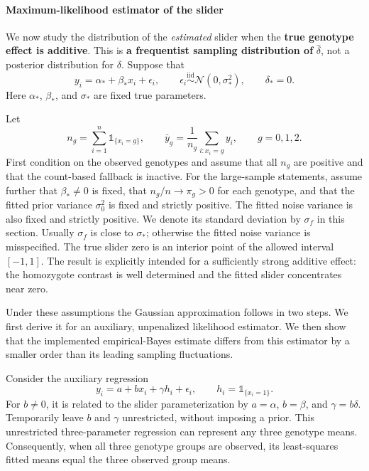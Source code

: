 \documentclass[11pt]{article}
\newcommand{\ind}{\mathbb{1}}
\newcommand{\Normal}{\mathcal{N}}
\begin{document}
\paragraph{Maximum-likelihood estimator of the slider}
We now study the distribution of the \emph{estimated} slider when the
\textbf{true genotype effect is additive}. This is \textbf{a frequentist
sampling distribution of} $\widehat\delta$, not a posterior distribution
for $\delta$. Suppose that
\begin{equation}
y_i=\alpha_*+\beta_*x_i+\epsilon_i,\qquad
\epsilon_i\overset{\mathrm{iid}}{\sim}\Normal(0,\sigma_*^2),
\qquad \delta_*=0.
\label{eq:additive-generating-model}
\end{equation}
Here $\alpha_*$, $\beta_*$, and $\sigma_*$ are fixed true parameters.

Let
\begin{equation}
n_g=\sum_{i=1}^n\ind_{\{x_i=g\}},\qquad
\bar y_g=\frac{1}{n_g}\sum_{i:x_i=g}y_i,
\qquad g=0,1,2.
\label{eq:genotype-group-statistics}
\end{equation}
First condition on the observed genotypes and assume that all $n_g$
are positive and that the count-based fallback is inactive. For the
large-sample statements, assume further that $\beta_*\neq0$ is fixed,
that $n_g/n\longrightarrow\pi_g>0$ for each genotype, and that the
fitted prior variance $\sigma_0^2$ is fixed and strictly positive.
The fitted noise variance is also fixed and strictly positive. We
denote its standard deviation by $\sigma_f$ in this section. Usually
$\sigma_f$ is close to $\sigma_*$; otherwise the fitted noise variance
is misspecified. The true slider zero is an interior point of
the allowed interval $[-1,1]$. The result is explicitly intended for
a sufficiently strong additive effect: the homozygote contrast is
well determined and the fitted slider concentrates near zero.

Under these assumptions the Gaussian approximation follows in
two steps. We first derive it for an auxiliary, unpenalized
likelihood estimator. We then show that the implemented
empirical-Bayes estimate differs from this estimator by a smaller
order than its leading sampling fluctuations.

Consider the auxiliary regression
\begin{equation}
y_i=a+b x_i+\gamma h_i+\epsilon_i,\qquad h_i=\ind_{\{x_i=1\}}.
\label{eq:auxiliary-regression}
\end{equation}
For $b\neq0$, it is related to the slider parameterization by
$a=\alpha$, $b=\beta$, and $\gamma=b\delta$. Temporarily leave
$b$ and $\gamma$ unrestricted, without imposing a prior. This
unrestricted three-parameter regression can represent any three
genotype means. Consequently, when all three genotype groups are
observed, its least-squares fitted means equal the three observed
group means.
\end{document}
